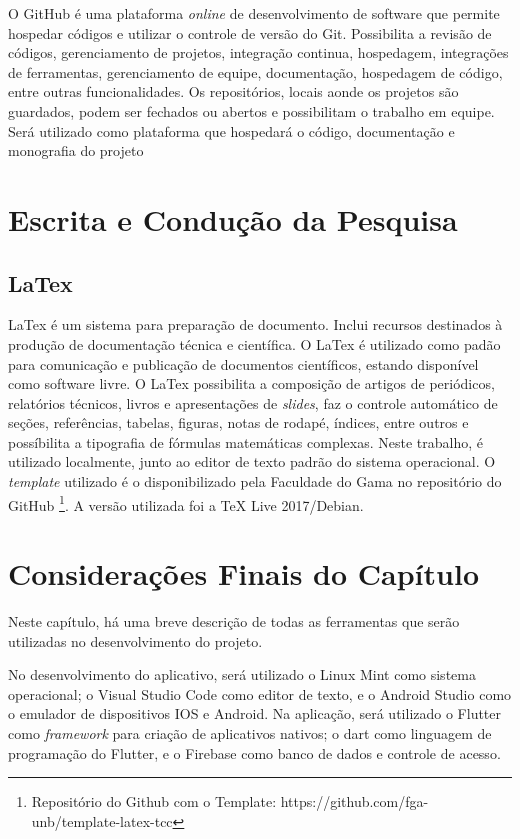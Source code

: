 O GitHub \cite{github2020} é uma plataforma \emph{online} de desenvolvimento de 
software que permite hospedar códigos e utilizar o controle de versão do Git. 
Possibilita a revisão de códigos, gerenciamento de projetos, integração continua, 
hospedagem, integrações de ferramentas, gerenciamento de equipe, documentação, 
hospedagem de código, entre outras funcionalidades. Os repositórios, locais 
aonde os projetos são guardados, podem ser fechados ou abertos e possibilitam o 
trabalho em equipe. Será utilizado como plataforma que hospedará o código, 
documentação e monografia do projeto

\section{Escrita e Condução da Pesquisa}

\subsection{LaTex}

LaTex \cite{latex2020} é um sistema para preparação de documento. Inclui 
recursos destinados à produção de documentação técnica e científica. O LaTex é 
utilizado como padão para comunicação e publicação de documentos científicos, estando 
disponível como software livre. O LaTex possibilita a composição de artigos de 
periódicos, relatórios técnicos, livros e apresentações de \emph{slides}, faz 
o controle automático de seções, referências, tabelas, figuras, notas de rodapé, 
índices, entre outros e possíbilita a tipografia de fórmulas matemáticas 
complexas. Neste trabalho, é utilizado localmente, junto ao editor de texto 
padrão do sistema operacional. O \emph{template} utilizado é o disponibilizado pela 
Faculdade do Gama no repositório do GitHub \footnote{Repositório do Github com o Template: https://github.com/fga-unb/template-latex-tcc}.
A versão utilizada foi a TeX Live 2017/Debian.

\section{Considerações Finais do Capítulo}

Neste capítulo, há uma breve descrição de todas as ferramentas que serão 
utilizadas no desenvolvimento do projeto. 

No desenvolvimento do aplicativo, será utilizado o Linux Mint como sistema 
operacional; o Visual Studio Code como editor de texto, e o Android Studio como 
o emulador de dispositivos IOS e Android. Na aplicação, será utilizado o Flutter 
como \emph{framework} para criação de aplicativos nativos; o dart como linguagem 
de programação do Flutter, e o Firebase como banco de dados e controle de acesso. 

